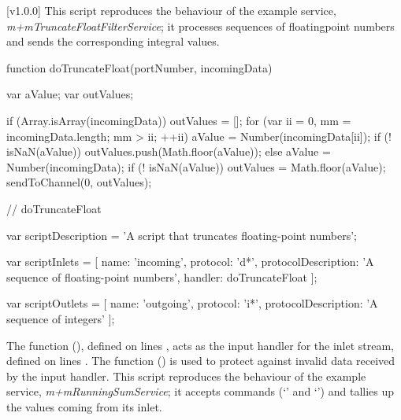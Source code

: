 [v1.0.0]
This script reproduces the behaviour of the example service,
\emph{m+mTruncateFloatFilterService}; it processes sequences of floating\longDash{}point
numbers and sends the corresponding integral values.
\codeBegin
\begin{listing}[5]{1}
function doTruncateFloat(portNumber, incomingData)
{
    var aValue;
    var outValues;
    
    if (Array.isArray(incomingData))
    {
        outValues = [];
        for (var ii = 0, mm = incomingData.length; mm > ii; ++ii)
        {
            aValue = Number(incomingData[ii]);
            if (! isNaN(aValue))
            {
                outValues.push(Math.floor(aValue));
            }
        }
    }
    else
    {
        aValue = Number(incomingData);
        if (! isNaN(aValue))
        {
            outValues = Math.floor(aValue);
        }
    }
    sendToChannel(0, outValues);
} // doTruncateFloat

var scriptDescription = 'A script that truncates floating-point numbers';

var scriptInlets = [ { name: 'incoming', protocol: 'd*',
                        protocolDescription: 'A sequence of floating-point numbers',
                        handler: doTruncateFloat } ];

var scriptOutlets = [ { name: 'outgoing', protocol: 'i*',
                        protocolDescription: 'A sequence of integers' } ];
\end{listing}
\codeEnd{}
The function (), defined on lines \longDash{},
acts as the input handler for the inlet stream, defined on lines
\longDash{}.
The function () is used to protect against invalid data received by the
input handler.
\secondaryEnd
\condPage
{}
This script reproduces the behaviour of the example service,
\emph{m+mRunningSumService}; it accepts commands (`' and
`') and tallies up the values coming from its inlet.
\codeBegin
